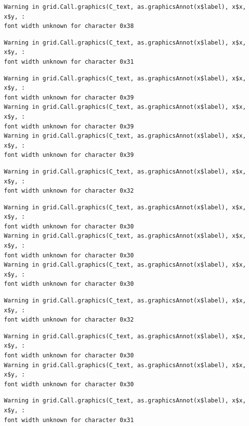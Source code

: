 \documentclass[
  letterpaper,
]{scrbook}
\begin{document}
\begin{verbatim}
Warning in grid.Call.graphics(C_text, as.graphicsAnnot(x$label), x$x, x$y, :
font width unknown for character 0x38
\end{verbatim}

\begin{verbatim}
Warning in grid.Call.graphics(C_text, as.graphicsAnnot(x$label), x$x, x$y, :
font width unknown for character 0x31
\end{verbatim}

\begin{verbatim}
Warning in grid.Call.graphics(C_text, as.graphicsAnnot(x$label), x$x, x$y, :
font width unknown for character 0x39
Warning in grid.Call.graphics(C_text, as.graphicsAnnot(x$label), x$x, x$y, :
font width unknown for character 0x39
Warning in grid.Call.graphics(C_text, as.graphicsAnnot(x$label), x$x, x$y, :
font width unknown for character 0x39
\end{verbatim}

\begin{verbatim}
Warning in grid.Call.graphics(C_text, as.graphicsAnnot(x$label), x$x, x$y, :
font width unknown for character 0x32
\end{verbatim}

\begin{verbatim}
Warning in grid.Call.graphics(C_text, as.graphicsAnnot(x$label), x$x, x$y, :
font width unknown for character 0x30
Warning in grid.Call.graphics(C_text, as.graphicsAnnot(x$label), x$x, x$y, :
font width unknown for character 0x30
Warning in grid.Call.graphics(C_text, as.graphicsAnnot(x$label), x$x, x$y, :
font width unknown for character 0x30
\end{verbatim}

\begin{verbatim}
Warning in grid.Call.graphics(C_text, as.graphicsAnnot(x$label), x$x, x$y, :
font width unknown for character 0x32
\end{verbatim}

\begin{verbatim}
Warning in grid.Call.graphics(C_text, as.graphicsAnnot(x$label), x$x, x$y, :
font width unknown for character 0x30
Warning in grid.Call.graphics(C_text, as.graphicsAnnot(x$label), x$x, x$y, :
font width unknown for character 0x30
\end{verbatim}

\begin{verbatim}
Warning in grid.Call.graphics(C_text, as.graphicsAnnot(x$label), x$x, x$y, :
font width unknown for character 0x31
\end{verbatim}
\end{document}
